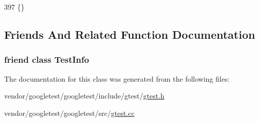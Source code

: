 \begin{DoxyCode}
397 \{\}
\end{DoxyCode}


\subsection{Friends And Related Function Documentation}
\subsubsection[{\texorpdfstring{Test\+Info}{TestInfo}}]{\setlength{\rightskip}{0pt plus 5cm}friend class {\bf Test\+Info}\hspace{0.3cm}{\ttfamily [friend]}}\hypertarget{classtesting_1_1Test_a4c49c2cdb6c328e6b709b4542f23de3c}{}\label{classtesting_1_1Test_a4c49c2cdb6c328e6b709b4542f23de3c}


The documentation for this class was generated from the following files\+:\begin{DoxyCompactItemize}
\item 
vendor/googletest/googletest/include/gtest/\hyperlink{gtest_8h}{gtest.\+h}\item 
vendor/googletest/googletest/src/\hyperlink{gtest_8cc}{gtest.\+cc}\end{DoxyCompactItemize}
